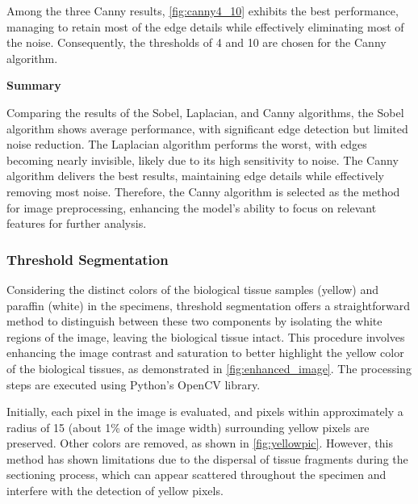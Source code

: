 Among the three Canny results, \autoref{fig:canny4_10} exhibits the best performance, managing to retain most of the edge details while effectively eliminating most of the noise. Consequently, the thresholds of 4 and 10 are chosen for the Canny algorithm.

\textbf{Summary}

Comparing the results of the Sobel, Laplacian, and Canny algorithms, the Sobel algorithm shows average performance, with significant edge detection but limited noise reduction. The Laplacian algorithm performs the worst, with edges becoming nearly invisible, likely due to its high sensitivity to noise. The Canny algorithm delivers the best results, maintaining edge details while effectively removing most noise. Therefore, the Canny algorithm is selected as the method for image preprocessing, enhancing the model's ability to focus on relevant features for further analysis.

\subsubsection{Threshold Segmentation}

Considering the distinct colors of the biological tissue samples (yellow) and paraffin (white) in the specimens, threshold segmentation offers a straightforward method to distinguish between these two components by isolating the white regions of the image, leaving the biological tissue intact. This procedure involves enhancing the image contrast and saturation to better highlight the yellow color of the biological tissues, as demonstrated in \autoref{fig:enhanced_image}. The processing steps are executed using Python's OpenCV library.

Initially, each pixel in the image is evaluated, and pixels within approximately a radius of 15 (about 1\% of the image width) surrounding yellow pixels are preserved. Other colors are removed, as shown in \autoref{fig:yellowpic}. However, this method has shown limitations due to the dispersal of tissue fragments during the sectioning process, which can appear scattered throughout the specimen and interfere with the detection of yellow pixels.

